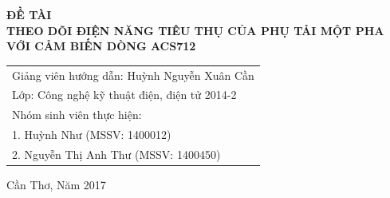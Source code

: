 \begin{titlepage}
    \vspace*{0.4cm}

    {\Large \bfseries ĐỀ TÀI \\ [0.2cm] THEO DÕI ĐIỆN NĂNG TIÊU THỤ CỦA PHỤ TẢI MỘT PHA VỚI CẢM BIẾN DÒNG ACS712} \\ [0.4cm] %


    \vspace*{1.0cm}



    \begin{tabular}{ll}
        \multicolumn{2}{l}{{\large Giảng viên hướng dẫn: \quad Huỳnh Nguyễn Xuân Cần}}\vspace{.3cm}\\
        \multicolumn{2}{l}{{\large Lớp: \quad Công nghệ kỹ thuật điện, điện tử  2014-2}}\vspace{.3cm}\\
        {\large Nhóm sinh viên thực hiện:} &\vspace{.2cm}\\
        {\large \hspace{1.5cm} 1. Huỳnh Như (MSSV:  1400012)}& \vspace{.2cm}\\
        {\large \hspace{1.5cm} 2. Nguyễn Thị Anh Thư (MSSV: 1400450)}& \vspace{.2cm}\\
    \end{tabular}





    \vfill\vfill %

    {\large Cần Thơ, Năm 2017} %

\end{titlepage}
